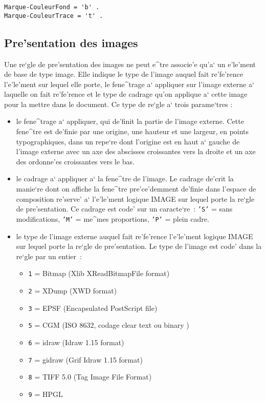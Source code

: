 \begin{verbatim}
Marque-CouleurFond = 'b' .
Marque-CouleurTrace = 't' .
\end{verbatim}

\subsection{Pre'sentation des images}

Une re`gle de pre'sentation des images ne peut e^tre associe'e qu'a` un
e'le'ment de base de type image. Elle indique le type de l'image auquel
fait re'fe'rence l'e'le'ment sur lequel elle porte, le fene^trage a` appliquer 
sur l'image externe a` laquelle on fait re'fe'rence et le type de cadrage
qu'on applique a` cette image pour la mettre dans le document.
Ce type de re`gle a` trois parame`tres :
\begin{itemize}
\item le fene^trage a` appliquer, qui de'finit la partie de l'image externe.
Cette fene^tre est de'finie par une origine, une hauteur et une largeur,
en points typographiques, dans un repe`re dont l'origine est en haut a`
gauche de l'image externe avec un axe des abscisses croissantes vers
la droite et un axe des ordonne'es croissantes vers le bas.
\item le cadrage a` appliquer a` la fene^tre de l'image. Le cadrage 
de'crit la manie`re dont on affiche la fene^tre pre'ce'demment de'finie dans
l'espace
de composition re'serve' a` l'e'le'ment logique IMAGE sur lequel porte la re`gle 
de pre'sentation. Ce cadrage est code' sur un caracte`re~: {\tt 'S'} = sans modifications,
{\tt 'M'} = me^mes proportions, {\tt 'P'} = plein cadre.
\item le type de l'image externe auquel fait re'fe'rence l'e'le'ment logique IMAGE sur lequel porte la re`gle 
de pre'sentation. Le type de l'image est code' dans la re`gle par un entier~:
\begin{itemize}
\item {\tt 1} = Bitmap (Xlib XReadBitmapFile format)
\item {\tt 2} = XDump (XWD format)
\item {\tt 3} = EPSF (Encapsulated PostScript file)
\item {\tt 5} = CGM (ISO 8632, codage clear text ou binary )
\item {\tt 6} = idraw (Idraw 1.15 format)
\item {\tt 7} = gidraw (Grif Idraw 1.15 format)
\item {\tt 8} = TIFF 5.0 (Tag Image File Format)
\item {\tt 9} = HPGL
\end{itemize}
\end{itemize}

